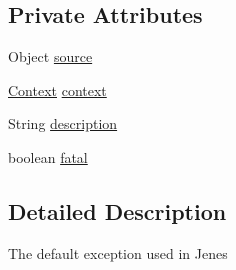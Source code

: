 \subsection*{Private Attributes}
\begin{DoxyCompactItemize}
\item 
Object \hyperlink{classjenes_1_1_jenes_exception_aa082145f9f5ec052a640e6b2c43fdf71}{source}
\item 
\hyperlink{enumjenes_1_1_jenes_exception_1_1_context}{Context} \hyperlink{classjenes_1_1_jenes_exception_a0ed4376ac804c15c7b6b69f4ba5db061}{context}
\item 
String \hyperlink{classjenes_1_1_jenes_exception_aff1de32172bcad9e5c5d547f6ba14176}{description}
\item 
boolean \hyperlink{classjenes_1_1_jenes_exception_aed895f6a8b793ec64394b3ed9f8a01e3}{fatal}
\end{DoxyCompactItemize}


\subsection{Detailed Description}
The default exception used in Jenes 


